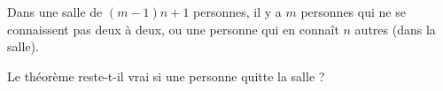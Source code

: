Dans une salle de $(m - 1)n + 1$ personnes, il y a $m$ personnes qui ne se connaissent pas deux à deux, ou une personne qui en connaît $n$ autres (dans la salle).

Le théorème reste-t-il vrai si une personne quitte la salle ?
